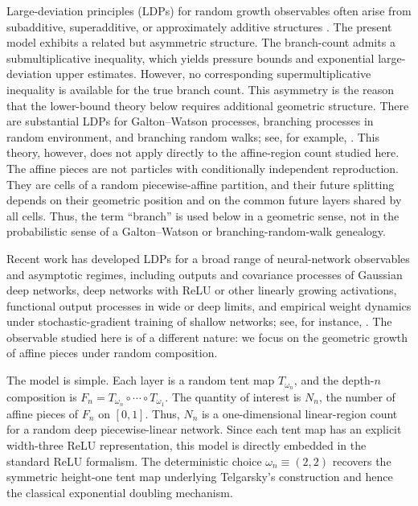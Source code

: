 \documentclass[11pt]{amsart}
\numberwithin{equation}{section}
\theoremstyle{plain}
\theoremstyle{definition}
\theoremstyle{remark}
\begin{document}
Large-deviation principles (LDPs) for random growth observables often arise from subadditive, superadditive, or approximately additive structures \cite{SeppalainenYukich2001}. The present model exhibits a related but asymmetric structure. The branch-count admits a submultiplicative inequality, which yields pressure bounds and exponential large-deviation upper estimates. However, no corresponding supermultiplicative inequality is available for the true branch count. This asymmetry is the reason that the lower-bound theory below requires additional geometric structure.
There are substantial LDPs for Galton--Watson processes,
branching processes in random environment, and branching random walks; see, for
example, \cite{BigginsBingham1993,NeyVidyashankar2004,
FleischmannWachtel2007,BansayeBerestycki2009}. This theory, however, does not
apply directly to the affine-region count studied here. The affine pieces are
not particles with conditionally independent reproduction. They are cells of a
random piecewise-affine partition, and their future splitting depends on their
geometric position and on the common future layers shared by all cells. Thus,
the term ``branch'' is used below in a geometric sense, not in the probabilistic
sense of a Galton--Watson or branching-random-walk genealogy.

Recent work has developed LDPs for a broad range of neural-network observables and asymptotic regimes, including outputs and covariance processes of Gaussian deep networks, deep networks with ReLU or other linearly growing activations, functional output processes in wide or deep limits, and empirical weight dynamics under stochastic-gradient training of shallow networks; see, for instance, \cite{MacciPacchiarottiTorrisi2026,AndreisBassettiHirsch2026,Vogel2026,DiLilloMacciPacchiarotti2026,MacciPacchiarottiPapagiannouliTorrisiTrevisan2026,HirschWillhalm2025}. The observable studied here is of a different nature: we focus on the geometric growth of affine pieces under random composition.

The model is simple. Each layer is a random tent map \(T_{\omega_n}\), and the depth-\(n\) composition is \(F_n=T_{\omega_n}\circ\cdots\circ T_{\omega_1}\). The quantity of interest is \(N_n\), the number of affine pieces of \(F_n\) on \([0,1]\). Thus, \(N_n\) is a one-dimensional linear-region count for a random deep piecewise-linear network. Since each tent map has an explicit width-three ReLU representation, this model is directly embedded in the standard ReLU formalism. The deterministic choice \(\omega_n\equiv (2,2)\) recovers the symmetric height-one tent map underlying Telgarsky's construction and hence the classical exponential doubling mechanism.
\end{document}

